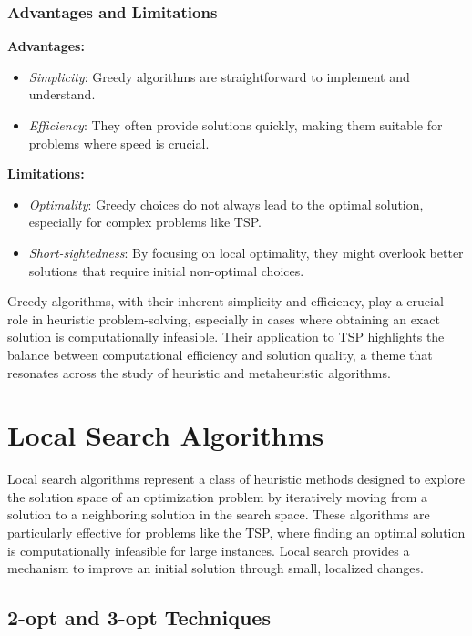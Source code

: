 \subsubsection{Advantages and Limitations}

\textbf{Advantages:}
\begin{itemize}
	\item \textit{Simplicity}: Greedy algorithms are straightforward to implement and understand.
	\item \textit{Efficiency}: They often provide solutions quickly, making them suitable for problems where speed is crucial.
\end{itemize}

\textbf{Limitations:}
\begin{itemize}
	\item \textit{Optimality}: Greedy choices do not always lead to the optimal solution, especially for complex problems like TSP.
	\item \textit{Short-sightedness}: By focusing on local optimality, they might overlook better solutions that require initial non-optimal choices.
\end{itemize}

Greedy algorithms, with their inherent simplicity and efficiency, play a crucial role in heuristic problem-solving, especially in cases where obtaining an exact solution is computationally infeasible. Their application to TSP highlights the balance between computational efficiency and solution quality, a theme that resonates across the study of heuristic and metaheuristic algorithms.
\section{Local Search Algorithms}

Local search algorithms represent a class of heuristic methods designed to explore the solution space of an optimization problem by iteratively moving from a solution to a neighboring solution in the search space. These algorithms are particularly effective for problems like the TSP, where finding an optimal solution is computationally infeasible for large instances. Local search provides a mechanism to improve an initial solution through small, localized changes.

\subsection{2-opt and 3-opt Techniques}

